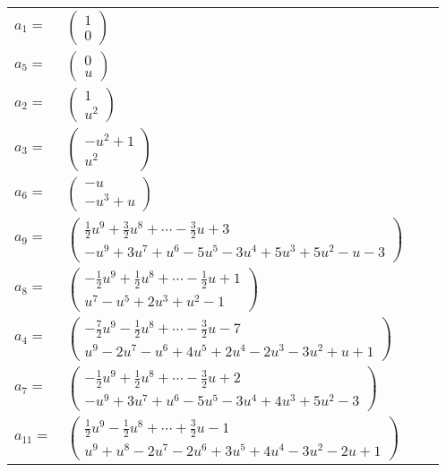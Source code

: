 \documentclass[1p]{elsarticle_modified}
\theoremstyle{definition}
\begin{document}
\begin{tabular}{m{7pt} m{180pt} m{7pt} m{180pt} }
\flushright $a_{1}=$&$\begin{pmatrix}1\\0\end{pmatrix}$ \\
\flushright $a_{5}=$&$\begin{pmatrix}0\\u\end{pmatrix}$ \\
\flushright $a_{2}=$&$\begin{pmatrix}1\\u^2\end{pmatrix}$ \\
\flushright $a_{3}=$&$\begin{pmatrix}- u^2+1\\u^2\end{pmatrix}$ \\
\flushright $a_{6}=$&$\begin{pmatrix}- u\\- u^3+u\end{pmatrix}$ \\
\flushright $a_{9}=$&$\begin{pmatrix}\frac{1}{2} u^9+\frac{3}{2} u^8+\cdots-\frac{3}{2} u+3\\- u^9+3 u^7+u^6-5 u^5-3 u^4+5 u^3+5 u^2- u-3\end{pmatrix}$ \\
\flushright $a_{8}=$&$\begin{pmatrix}-\frac{1}{2} u^9+\frac{1}{2} u^8+\cdots-\frac{1}{2} u+1\\u^7- u^5+2 u^3+u^2-1\end{pmatrix}$ \\
\flushright $a_{4}=$&$\begin{pmatrix}-\frac{7}{2} u^9-\frac{1}{2} u^8+\cdots-\frac{3}{2} u-7\\u^9-2 u^7- u^6+4 u^5+2 u^4-2 u^3-3 u^2+u+1\end{pmatrix}$ \\
\flushright $a_{7}=$&$\begin{pmatrix}-\frac{1}{2} u^9+\frac{1}{2} u^8+\cdots-\frac{3}{2} u+2\\- u^9+3 u^7+u^6-5 u^5-3 u^4+4 u^3+5 u^2-3\end{pmatrix}$ \\
\flushright $a_{11}=$&$\begin{pmatrix}\frac{1}{2} u^9-\frac{1}{2} u^8+\cdots+\frac{3}{2} u-1\\u^9+u^8-2 u^7-2 u^6+3 u^5+4 u^4-3 u^2-2 u+1\end{pmatrix}$ \\

\end{tabular}
\end{document}
